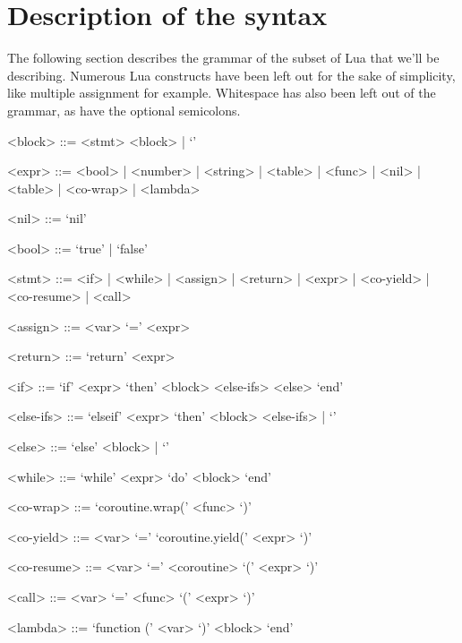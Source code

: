 \documentclass{article}
\begin{document}
\section{Description of the syntax}

The following section describes the grammar of the subset of Lua that we'll be
describing. Numerous Lua constructs have been left out for the sake of
simplicity, like multiple assignment for example. Whitespace has also been left
out of the grammar, as have the optional semicolons. 

\newpage

\begin{grammar}
	<block> ::= <stmt> <block> | `' %
	
	<expr> ::= <bool> | <number> | <string> | <table> | <func>  | <nil> | <table> | <co-wrap>
		| <lambda> 
	
	<nil> ::= `nil'
	
	<bool> ::= `true' | `false'
	
	<stmt> ::= <if> | <while> | <assign> | <return> | <expr> | %
		<co-yield> | <co-resume> | <call>
	
	<assign> ::= <var> `=' <expr>
	
	<return> ::= `return' <expr>
	
	<if> ::= `if' <expr> `then' <block> <else-ifs> <else> `end'

	
	<else-ifs> ::= `elseif' <expr> `then' <block> <else-ifs> | `'
	
	<else> ::= `else' <block> | `'
	
	<while> ::= `while' <expr> `do' <block> `end'
	
	

	<co-wrap> ::= `coroutine.wrap(' <func> `)'

	<co-yield> ::= <var> `=' `coroutine.yield(' <expr> `)'

	<co-resume> ::= <var> `=' <coroutine> `(' <expr> `)'

	<call> ::= <var> `=' <func> `(' <expr> `)'

	<lambda> ::= `function (' <var> `)' <block> `end'
\end{grammar}
\end{document}
